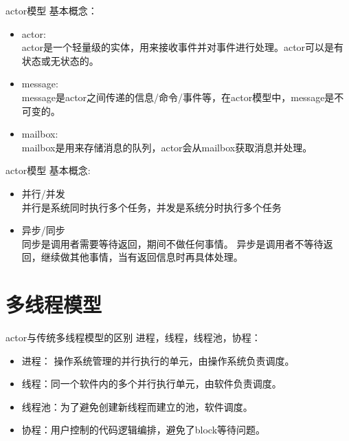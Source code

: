 \documentclass[UTF8]{ctexbeamer}
\begin{document}
\begin{frame}{actor模型}
  基本概念：
  \begin{itemize}
  \item actor:\\
    actor是一个轻量级的实体，用来接收事件并对事件进行处理。actor可以是有状态或无状态的。
  \item message:\\
    message是actor之间传递的信息/命令/事件等，在actor模型中，message是不可变的。
  \item mailbox:\\
    mailbox是用来存储消息的队列，actor会从mailbox获取消息并处理。
  \end{itemize}
\end{frame}

\begin{frame}{actor模型}
  基本概念: 
  \begin{itemize}
  \item 并行/并发 \\
    并行是系统同时执行多个任务，并发是系统分时执行多个任务
  \item 异步/同步 \\
    同步是调用者需要等待返回，期间不做任何事情。
    异步是调用者不等待返回，继续做其他事情，当有返回信息时再具体处理。
  \end{itemize}
\end{frame}

\section{多线程模型}
\frame{\tableofcontents[currentsection]} %
\begin{frame} {actor与传统多线程模型的区别}
  进程，线程，线程池，协程：
  \begin{itemize}
  \item 进程： 操作系统管理的并行执行的单元，由操作系统负责调度。
  \item 线程：同一个软件内的多个并行执行单元，由软件负责调度。
  \item 线程池：为了避免创建新线程而建立的池，软件调度。
  \item 协程：用户控制的代码逻辑编排，避免了block等待问题。
  \end{itemize}
\end{frame}
\end{document}
